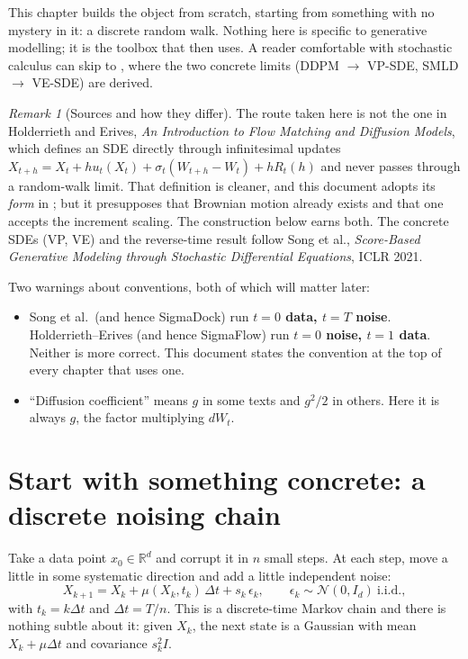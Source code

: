 \documentclass[11pt,a4paper]{report}
\theoremstyle{definition}
\theoremstyle{remark}
\newtheorem{remark}[remark]{Remark}
\newcommand{\RR}{\mathbb R}
\begin{document}
This chapter builds the object from scratch, starting from something with no
mystery in it: a discrete random walk. Nothing here is specific to
generative modelling; it is the toolbox that  then uses.
A reader comfortable with stochastic calculus can skip to
, where the two concrete limits (DDPM $\to$ VP-SDE,
SMLD $\to$ VE-SDE) are derived.

\begin{remark}[Sources and how they differ]
\label{rem:sde-sources}
The route taken here is not the one in Holderrieth and Erives,
\emph{An Introduction to Flow Matching and Diffusion Models}, which defines
an SDE directly through infinitesimal updates
$X_{t+h}=X_t+hu_t(X_t)+\sigma_t(W_{t+h}-W_t)+hR_t(h)$ and never passes
through a random-walk limit. That definition is cleaner, and this document
adopts its \emph{form} in ; but it presupposes that
Brownian motion already exists and that one accepts the increment scaling.
The construction below earns both. The concrete SDEs (VP, VE) and the
reverse-time result follow Song et al., \emph{Score-Based Generative
Modeling through Stochastic Differential Equations}, ICLR 2021.

Two warnings about conventions, both of which will matter later:
\begin{itemize}
\item Song et al.\ (and hence SigmaDock) run \textbf{$t=0$ data,
      $t=T$ noise}. Holderrieth--Erives (and hence SigmaFlow) run
      \textbf{$t=0$ noise, $t=1$ data}. Neither is more correct. This
      document states the convention at the top of every chapter that uses
      one.
\item ``Diffusion coefficient'' means $g$ in some texts and $g^2/2$ in
      others. Here it is always $g$, the factor multiplying $dW_t$.
\end{itemize}
\end{remark}

\section{Start with something concrete: a discrete noising chain}
\label{sec:sde-discrete-chain}

Take a data point $x_0\in\RR^d$ and corrupt it in $n$ small steps. At each
step, move a little in some systematic direction and add a little
independent noise:
\begin{equation}
\label{eq:sde-discrete-chain}
X_{k+1} = X_k + \mu(X_k,t_k)\,\Delta t + s_k\,\epsilon_k,
\qquad \epsilon_k\sim\mathcal N(0,I_d)\ \text{i.i.d.},
\end{equation}
with $t_k=k\Delta t$ and $\Delta t=T/n$. This is a discrete-time Markov
chain and there is nothing subtle about it: given $X_k$, the next state is a
Gaussian with mean $X_k+\mu\Delta t$ and covariance $s_k^2I$.
\end{document}
